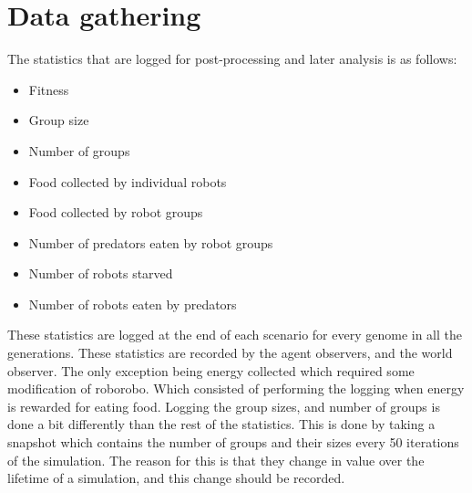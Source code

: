 \clearpage
\section{Data gathering}
The statistics that are logged for post-processing and later analysis is as follows:
\begin{itemize}
	\item Fitness
	\item Group size
	\item Number of groups
	\item Food collected by individual robots
	\item Food collected by robot groups
	\item Number of predators eaten by robot groups
	\item Number of robots starved
	\item Number of robots eaten by predators
\end{itemize}
These statistics are logged at the end of each scenario for every genome in all the generations.
These statistics are recorded by the agent observers, and the world observer. 
The only exception being energy collected which required some modification of roborobo.
Which consisted of performing the logging when energy is rewarded for eating food.
Logging the group sizes, and number of groups is done a bit differently than the rest of the statistics.
This is done by taking a snapshot which contains the number of groups and their sizes every 50 iterations of the simulation.
The reason for this is that they change in value over the lifetime of a simulation, and this change should be recorded.



\clearpage
